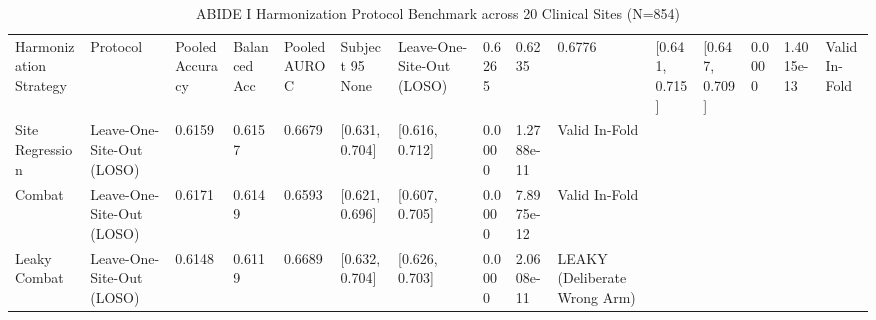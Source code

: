 \begin{table}
\caption{ABIDE I Harmonization Protocol Benchmark across 20 Clinical Sites (N=854)}
\label{tab:harmonization}
\begin{tabular}{llllllllll}
\toprule
Harmonization Strategy & Protocol & Pooled Accuracy & Balanced Acc & Pooled AUROC & Subject 95%
\midrule
None & Leave-One-Site-Out (LOSO) & 0.6265 & 0.6235 & 0.6776 & [0.641, 0.715] & [0.647, 0.709] & 0.0000 & 1.4015e-13 & Valid In-Fold \\
Site Regression & Leave-One-Site-Out (LOSO) & 0.6159 & 0.6157 & 0.6679 & [0.631, 0.704] & [0.616, 0.712] & 0.0000 & 1.2788e-11 & Valid In-Fold \\
Combat & Leave-One-Site-Out (LOSO) & 0.6171 & 0.6149 & 0.6593 & [0.621, 0.696] & [0.607, 0.705] & 0.0000 & 7.8975e-12 & Valid In-Fold \\
Leaky Combat & Leave-One-Site-Out (LOSO) & 0.6148 & 0.6119 & 0.6689 & [0.632, 0.704] & [0.626, 0.703] & 0.0000 & 2.0608e-11 & LEAKY (Deliberate Wrong Arm) \\
\bottomrule
\end{tabular}
\end{table}
